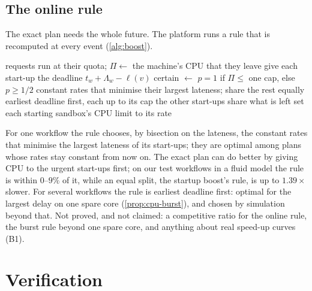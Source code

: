 \subsection{The online rule}

The exact plan needs the whole future. The platform runs a rule that is recomputed at every
event (\cref{alg:boost}).

\begin{algorithm}[t]
\caption{\textsc{Boost} (event-driven, per machine): CPU for start-ups.}
\label{alg:boost}
\begin{algorithmic}[1]
  \State requests run at their quota; $\Pi \gets$ the machine's CPU that they leave
  \State give each start-up the deadline $t_w + \Lambda_w - \ell(v)$
  \State certain $\gets$ $p = 1$ if $\Pi \le$ one cap, else $p \ge 1/2$
    \State constant rates that minimise their largest lateness; share the rest equally
  \Else
    \State earliest deadline first, each up to its cap 
  \EndIf
  \State the other start-ups share what is left 
  \State set each starting sandbox's CPU limit to its rate
\EndOn
\end{algorithmic}
\end{algorithm}

For one workflow the rule chooses, by bisection on the lateness, the constant rates that
minimise the largest lateness of its start-ups; they are optimal among plans whose rates stay
constant from now on. The exact plan can do better by giving CPU to the urgent start-ups first;
on our test workflows in a fluid model the rule is within $0$--$9\%$ of it, while an equal split,
the startup boost's rule, is up to $1.39\times$ slower. For several workflows the rule is
earliest deadline first: optimal for the largest delay on one spare core
(\cref{prop:cpu-burst}), and chosen by simulation beyond that. Not proved, and not claimed: a
competitive ratio for the online rule, the burst rule beyond one spare core, and anything about
real speed-up curves (B1).

\section{Verification}
\label{sec:th-verification}

